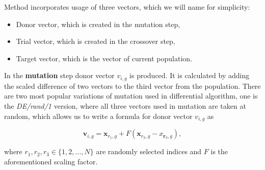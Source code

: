 \documentclass[12pt,a4paper,openany]{book}
\begin{document}
\noindent Method incorporates usage of three vectors, which we will name for simplicity:

\begin{itemize}
\item Donor vector, which is created in the mutation step,
\item Trial vector, which is created in the crossover step,
\item Target vector, which is the vector of current population.
\end{itemize}


\noindent In the \textbf{mutation} step donor vector $v_{i, g}$ is produced. It is calculated by adding the scaled difference of two vectors to the third vector from the population. There are two most popular variations of mutation used in differential algorithm, one is the \textit{DE/rand/1} version, where all three vectors used in mutation are taken at random, which allows us to write a formula for donor vector  $v_{i, g}$ as

\begin{equation}
\mathbf{v}_{i, g}=\mathbf{x}_{r_{1}, g}+F\left(\mathbf{x}_{r_{2}, g}-x_{\mathbf{r}_{3}, g}\right),
\end{equation}

\noindent where $r_{1}, r_{2},r_{3} \in \{1, 2, ..., N\}$ are randomly selected indices and $F$ is the aforementioned scaling factor.
\end{document}

